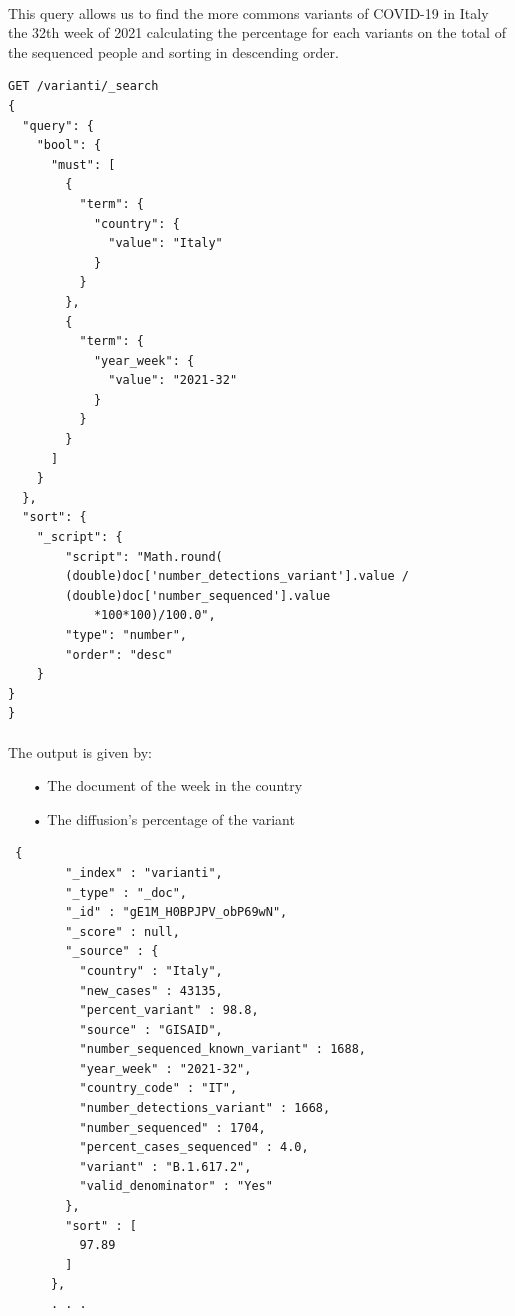 \documentclass[a4paper,12pt]{article}
\begin{document}
\paragraph{} This query allows us to find the more commons variants of COVID-19 in Italy the 32th week of 2021 calculating the percentage for each variants on the total of the sequenced people and sorting in descending order.
\begin{tcolorbox}[colback=green!5!white,colframe=green!75!black,title=QUERY]
\begin{verbatim}
GET /varianti/_search
{
  "query": {
    "bool": {
      "must": [
        {
          "term": {
            "country": {
              "value": "Italy"
            }
          }
        },
        {
          "term": {
            "year_week": {
              "value": "2021-32"
            }
          }
        }
      ]
    }
  },
  "sort": {
    "_script": {
        "script": "Math.round(
        (double)doc['number_detections_variant'].value / 
        (double)doc['number_sequenced'].value 
        	*100*100)/100.0",
        "type": "number",
        "order": "desc"
    }
}
}
\end{verbatim}
\end{tcolorbox}

\paragraph{} The output is given by: 
\begin{itemize}[noitemsep]
\item[•] The document of the week in the country
\item[•] The diffusion's percentage of the variant
\end{itemize}

\begin{tcolorbox}[colback=red!5!white,colframe=red!75!black,title=OUTPUT]
\begin{verbatim}
 {
        "_index" : "varianti",
        "_type" : "_doc",
        "_id" : "gE1M_H0BPJPV_obP69wN",
        "_score" : null,
        "_source" : {
          "country" : "Italy",
          "new_cases" : 43135,
          "percent_variant" : 98.8,
          "source" : "GISAID",
          "number_sequenced_known_variant" : 1688,
          "year_week" : "2021-32",
          "country_code" : "IT",
          "number_detections_variant" : 1668,
          "number_sequenced" : 1704,
          "percent_cases_sequenced" : 4.0,
          "variant" : "B.1.617.2",
          "valid_denominator" : "Yes"
        },
        "sort" : [
          97.89
        ]
      },
      . . .
\end{verbatim}
\end{tcolorbox}
\end{document}
